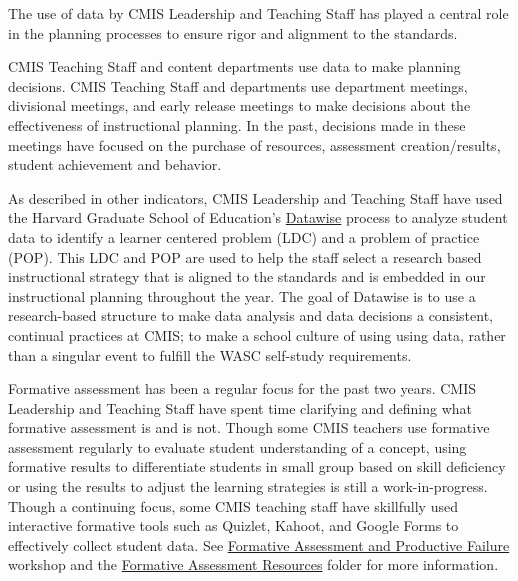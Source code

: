 \begin{findings}
The use of data by CMIS Leadership and Teaching Staff has played a central role in the planning processes to ensure rigor and alignment to the standards. 


CMIS Teaching Staff and content departments use data to make planning decisions. CMIS Teaching Staff and departments use department meetings, divisional meetings, and early release meetings to make decisions about the effectiveness of instructional planning. In the past, decisions made in these meetings have focused on the purchase of resources, assessment creation/results, student achievement and behavior. 

As described in other indicators, CMIS Leadership and Teaching Staff have used the Harvard Graduate School of Education’s \href{https://docs.google.com/a/cmis.ac.th/presentation/d/1omzyjfwf5fazGCSuvw7dDQn4eqhpOIaldeLXY7-6PYQ/edit?usp=sharing}{Datawise} process to analyze student data to identify a learner centered problem (LDC) and a problem of practice (POP). This LDC and POP are used to help the staff select a research based instructional strategy that is aligned to the standards and is embedded in our instructional planning  throughout the year. The goal of Datawise is to use a research-based structure to make data analysis and data decisions a consistent, continual practices at CMIS; to make a school culture of using using data, rather than a singular event to fulfill the WASC self-study requirements. 


Formative assessment has been a regular focus for the past two years. CMIS Leadership and Teaching Staff have spent time clarifying and defining what formative assessment is and is not. Though some CMIS teachers use formative assessment regularly to evaluate student understanding of a concept,  using formative results to differentiate students in small group based on skill deficiency or using the results to adjust the learning strategies is still a work-in-progress. Though a continuing focus, some CMIS teaching staff have skillfully used interactive formative tools such as Quizlet, Kahoot, and Google Forms to effectively collect student data. See \href{https://docs.google.com/a/cmis.ac.th/presentation/d/1S1x1yEj7KDD6jM7u1RdTZJEt10_0r6mcJ-LmRb6iPWs/edit?usp=sharing}{Formative Assessment and Productive Failure} workshop and the \href{https://drive.google.com/drive/folders/0ByVFfrm0zfolaFNZMDVFZnFLazA?usp=sharing}{Formative Assessment Resources} folder for more information. 


\end{findings}
